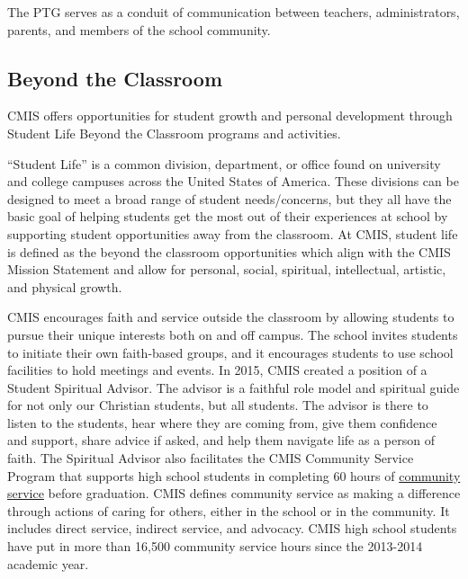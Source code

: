 The PTG serves as a conduit of communication between teachers, administrators, parents, and members of the school community.  


\subsection{Beyond the Classroom}

CMIS offers opportunities for student growth and personal development through Student Life Beyond the Classroom programs and activities.  


“Student Life” is a common division, department, or office found on university and college campuses across the United States of America.  These divisions can be designed to meet a broad range of student needs/concerns, but they all have the basic goal of helping students get the most out of their experiences at school by supporting student opportunities away from the classroom.  At CMIS, student life is defined as the beyond the classroom opportunities which align with the CMIS Mission Statement and allow for personal, social, spiritual, intellectual, artistic, and physical growth.


CMIS encourages faith and service outside the classroom by allowing students to pursue their unique interests both on and off campus. The school invites students to initiate their own faith-based groups, and it encourages students to use school facilities to hold meetings and events.  In 2015, CMIS created a position of  a Student Spiritual Advisor.  The advisor is a faithful role model and spiritual guide for not only our Christian students, but all students. The advisor is there to listen to the students, hear where they are coming from, give them confidence and support, share advice if asked, and help them navigate life as a person of faith. The Spiritual Advisor also facilitates the CMIS Community Service Program that supports high school students in completing 60 hours of \href{http://cmis.ac.th/programs/community_service}{community service} before graduation. CMIS defines community service as making a difference through actions of caring for others, either in the school or in the community.  It includes direct service, indirect service, and advocacy. CMIS high school students have put in more than 16,500 community service hours since the 2013-2014 academic year.

